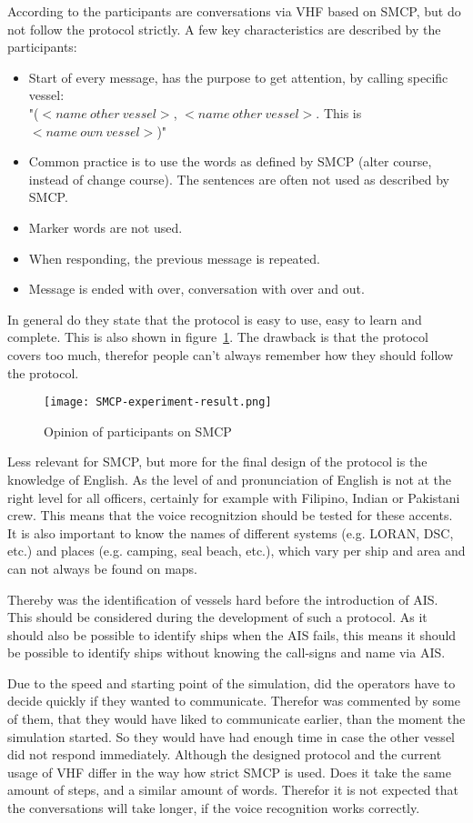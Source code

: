 According to the participants are conversations via \ac{VHF} based on \ac{SMCP}, but do not follow the protocol strictly. A few key characteristics are described by the participants:
\begin{itemize}
	\item Start of every message, has the purpose to get attention, by calling specific vessel: \\ "($<name~other~vessel>$, $<name~other~vessel>$. This is $<name~own~vessel>$)"
	\item Common practice is to use the words as defined by \ac{SMCP} (alter course, instead of change course). The sentences are often not used as described by \ac{SMCP}.
	\item Marker words are not used.
	\item When responding, the previous message is repeated.
	\item Message is ended with over, conversation with over and out.
\end{itemize}
In general do they state that the protocol is easy to use, easy to learn and complete. This is also shown in figure~\ref{fig:SMCP-experiment-result}. The drawback is that the protocol covers too much, therefor people can't always remember how they should follow the protocol. 

\begin{figure}[h]
	\centering
	\texttt{[image: SMCP-experiment-result.png]}
	\caption{Opinion of participants on SMCP}
	\label{fig:SMCP-experiment-result}
\end{figure}

Less relevant for \ac{SMCP}, but more for the final design of the protocol is the knowledge of English. As the level of and pronunciation of English is not at the right level for all officers, certainly for example with Filipino, Indian or Pakistani crew. This means that the voice recognitzion should be tested for these accents. It is also important to know the names of different systems (e.g. LORAN, DSC, etc.) and places (e.g. camping, seal beach, etc.), which vary per ship and area and can not always be found on maps.

Thereby was the identification of vessels hard before the introduction of AIS. This should be considered during the development of such a protocol. As it should also be possible to identify ships when the \ac{AIS} fails, this means it should be possible to identify ships without knowing the call-signs and name via \ac{AIS}.

Due to the speed and starting point of the simulation, did the operators have to decide quickly if they wanted to communicate. Therefor was commented by some of them, that they would have liked to communicate earlier, than the moment the simulation started. So they would have had enough time in case the other vessel did not respond immediately. Although the designed protocol and the current usage of \ac{VHF} differ in the way how strict SMCP is used. Does it take the same amount of steps, and a similar amount of words. Therefor it is not expected that the conversations will take longer, if the voice recognition works correctly.

